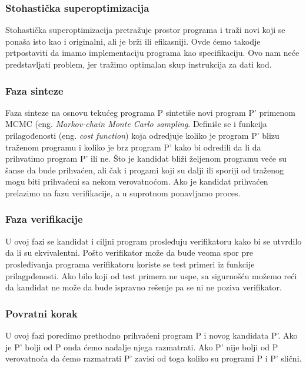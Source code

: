 \subsubsection{Stohastička superoptimizacija}
\label{subsec:stohastickaSuperoptimizacija}

Stohastička superoptimizacija pretražuje prostor programa i traži novi koji se ponaša isto kao i originalni, ali je brži ili efikasniji. Ovde ćemo takodje prtpostaviti da imamo implementaciju programa kao specifikaciju. Ovo nam neće predstavljati problem, jer tražimo optimalan skup instrukcija za dati kod.

\subsubsection*{Faza sinteze}

Faza sinteze na osnovu tekućeg programa P sintetiše novi program P' primenom  MCMC (eng. \emph{Markov-chain Monte Carlo sampling}. Definiše se i funkcija prilagođenosti (eng. \emph{cost function}) koja odredjuje koliko je program P' blizu traženom programu i koliko je brz program P' kako bi odredili da li da prihvatimo program P' ili ne. Što je kandidat bliži željenom programu veće su šanse da bude prihvaćen, ali čak i progami koji su dalji ili sporiji od traženog mogu biti prihvaćeni sa nekom verovatnoćom. Ako je kandidat prihvaćen prelazimo na fazu verifikacije, a u suprotnom ponavljamo proces.

\subsubsection*{Faza verifikacije}

U ovoj fazi se kandidat i ciljni program prosleđuju verifikatoru kako bi se utvrdilo da li su ekvivalentni. Pošto verifikator može da bude veoma spor pre prosleđivanja programa verifikatoru koriste se test primeri iz funkcije prilagpđenosti. Ako bilo koji od test primera ne uspe, sa sigurnošću možemo reći da kandidat ne može da bude ispravno rešenje pa se ni ne poziva verifikator.

\subsubsection*{Povratni korak}

U ovoj fazi poredimo prethodno prihvaćeni program P i novog kandidata P'. Ako je P' bolji od P onda ćemo nadalje njega razmatrati. Ako P' nije bolji od P verovatnoća da ćemo razmatrati P' zavisi od toga koliko su programi P i P' slični.

